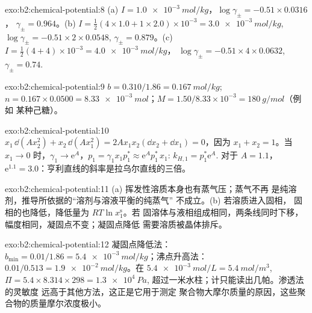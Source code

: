 \begin{solution}{exo:b2:chemical-potential:8}
(a) $I = \qty{1.0e-3}{mol/kg}$，$\log\gamma_\pm = -0.51 \times 0.0316$，
$\gamma_\pm = 0.964$。(b) $I = \frac12(4 \times 1.0 + 1 \times 2.0) \times
10^{-3} = \qty{3.0e-3}{mol/kg}$, $\log\gamma_\pm = -0.51 \times 2 \times 0.0548$,
$\gamma_\pm = 0.879$。(c) $I = \frac12(4 + 4) \times 10^{-3} = \qty{4.0e-3}{mol/kg}$，
$\log\gamma_\pm = -0.51 \times 4 \times 0.0632$, $\gamma_\pm = 0.74$.
\end{solution}

\begin{solution}{exo:b2:chemical-potential:9}
$b = 0.310/1.86 = \qty{0.167}{mol/kg}$; $n = 0.167 \times 0.0500 =
\qty{8.33e-3}{mol}$；$M = 1.50/8.33 \times 10^{-3} = \qty{180}{g/mol}$（例如
某种己糖）。
\end{solution}

\begin{solution}{exo:b2:chemical-potential:10}
$x_1\,\dd(Ax_2^2) + x_2\,\dd(Ax_1^2) = 2Ax_1x_2(\dd x_2 + \dd x_1) = 0$，因为
$x_1 + x_2 = 1$。当 $x_1 \to 0$ 时，$\gamma_1 \to \mathrm e^{A}$，$p_1 =
\gamma_1x_1p_1^* \approx \mathrm e^{A}p_1^*\,x_1$: $k_{H,1} = p_1^*\mathrm e^A$.
对于 $A = 1.1$，$\mathrm e^{1.1} = 3.0$：亨利直线的斜率是拉乌尔直线的三倍。
\end{solution}

\begin{solution}{exo:b2:chemical-potential:11}
(a) 挥发性溶质本身也有蒸气压；蒸气不再
是纯溶剂，推导所依据的“溶剂与溶液平衡的纯蒸气”
不成立。(b) 若溶质进入固相，
固相的也降低，降低量为 $RT\ln x_1^{\text{s}}$。若
固溶体与液相组成相同，两条线同时下移，
幅度相同，凝固点不变；凝固点降低
需要溶质被晶体排斥。
\end{solution}

\begin{solution}{exo:b2:chemical-potential:12}
凝固点降低法：$b_{\min} = 0.01/1.86 = \qty{5.4e-3}{mol/kg}$；沸点升高法：
$0.01/0.513 = \qty{1.9e-2}{mol/kg}$。在 $\qty{5.4e-3}{mol/L} =
\qty{5.4}{mol/m^3}$, $\Pi = 5.4 \times 8.314 \times 298 = \qty{1.3e4}{Pa}$,
超过一米水柱；计只能读出几帕。渗透法的灵敏度
远高于其他方法，这正是它用于测定
聚合物大摩尔质量的原因，这些聚合物的质量摩尔浓度极小。
\end{solution}


